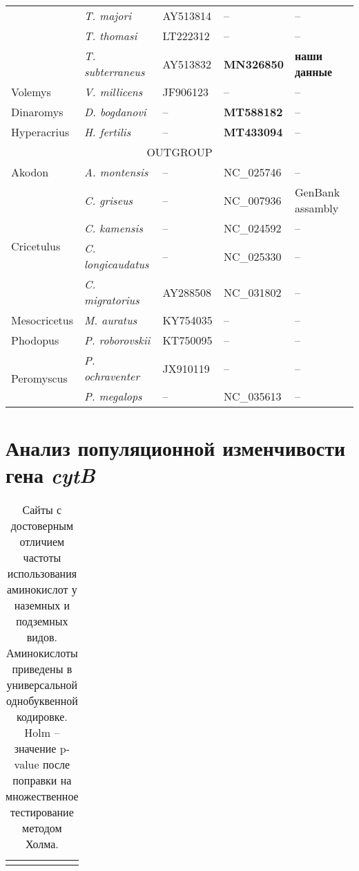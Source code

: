 \begin{landscape}
\begin{center}
\begin{longtable}{|p{3.5cm}|p{4.5cm}|p{4.0cm}|p{6.5cm}|p{4.5cm}|}
& \textit{T. majori} & AY513814 & -- & --\\ \cline{2-5}
& \textit{T. thomasi} & LT222312 & -- & --\\ \cline{2-5}
& \textit{T. subterraneus} & AY513832 & \textbf{MN326850} & \textbf{наши данные}\\ \hline
Volemys & \textit{V. millicens} & JF906123 & -- & --\\ \hline
Dinaromys & \textit{D. bogdanovi} & -- & \textbf{MT588182} & --\\ \hline
Hyperacrius & \textit{H. fertilis} & -- & \textbf{MT433094} & --\\ \hline
\multicolumn{5}{|c|}{OUTGROUP} \\ \hline
Akodon & \textit{A. montensis} & -- & NC\_025746 & --\\ \hline
\multirow{4}{*}{Cricetulus} & \textit{C. griseus} & -- & NC\_007936 & GenBank assambly\\ \cline{2-5}
& \textit{C. kamensis} & -- & NC\_024592 & --\\ \cline{2-5}
& \textit{C. longicaudatus} & -- & NC\_025330 & --\\ \cline{2-5}
& \textit{C. migratorius} & AY288508 & NC\_031802 & --\\ \hline
Mesocricetus & \textit{M. auratus} & KY754035 & -- & --\\ \hline
Phodopus & \textit{P. roborovskii} & KT750095 & -- & --\\ \hline
\multirow{2}{*}{Peromyscus} & \textit{P. ochraventer} &  JX910119 & -- & --\\ \cline{2-5}
& \textit{P. megalops} & -- & NC\_035613 & --\\ \hline


\end{longtable}

\end{center}


\chapter{Анализ популяционной изменчивости гена \textit{cytB}}

\begin{longtable}{|l|l|p{10.5cm}|p{10.5cm}|}
	\caption{Сайты с достоверным отличием частоты использования аминокислот у наземных и подземных видов. Аминокислоты приведены в универсальной однобуквенной кодировке. Holm – значение p-value после поправки на множественное тестирование методом Холма.} \label{BigTable} \vspace{5mm} \\
	

\end{longtable}
\end{landscape}
